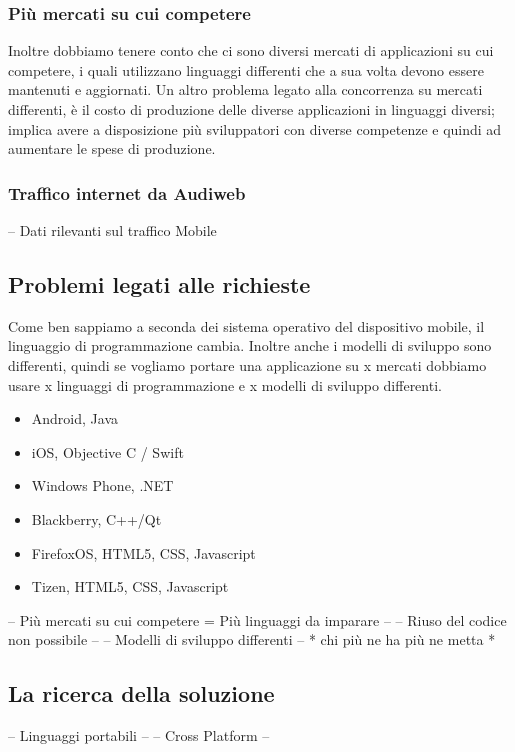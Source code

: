 \subsubsection{Più mercati su cui competere}
Inoltre dobbiamo tenere conto che ci sono diversi mercati di applicazioni su cui competere, i quali utilizzano linguaggi differenti che a sua volta devono essere mantenuti e aggiornati.
Un altro problema legato alla concorrenza su mercati differenti, è il costo di produzione delle diverse applicazioni in linguaggi diversi; implica avere a disposizione più sviluppatori con diverse competenze e quindi ad aumentare le spese di produzione.
\subsubsection{Traffico internet da Audiweb}
-- Dati rilevanti sul traffico Mobile
\subsection{Problemi legati alle richieste}
Come ben sappiamo a seconda dei sistema operativo del dispositivo mobile, il linguaggio di programmazione cambia. Inoltre anche i modelli di sviluppo sono differenti, quindi se vogliamo portare una applicazione su x mercati dobbiamo usare x linguaggi di programmazione e x modelli di sviluppo differenti.
\begin{itemize}
\item Android, Java
\item iOS, Objective C / Swift
\item Windows Phone, .NET
\item Blackberry, C++/Qt
\item FirefoxOS, HTML5, CSS, Javascript
\item Tizen, HTML5, CSS, Javascript
\end{itemize}
 
-- Più mercati su cui competere = Più linguaggi da imparare --
-- Riuso del codice non possibile -- 
-- Modelli di sviluppo differenti --
 * chi più ne ha più ne metta *
\subsection{La ricerca della soluzione}  
-- Linguaggi portabili --
-- Cross Platform --
 